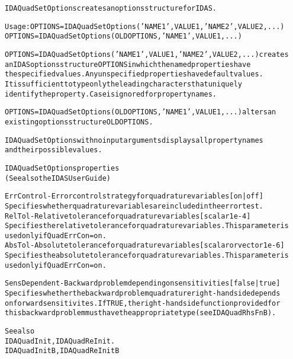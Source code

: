 \begin{alltt}
IDAQuadSetOptions creates an options structure for IDAS.

   Usage: OPTIONS = IDAQuadSetOptions('NAME1',VALUE1,'NAME2',VALUE2,...)
          OPTIONS = IDAQuadSetOptions(OLDOPTIONS,'NAME1',VALUE1,...)

   OPTIONS = IDAQuadSetOptions('NAME1',VALUE1,'NAME2',VALUE2,...) creates 
   an IDAS options structure OPTIONS in which the named properties have 
   the specified values. Any unspecified properties have default values. 
   It is sufficient to type only the leading characters that uniquely 
   identify the property. Case is ignored for property names. 
   
   OPTIONS = IDAQuadSetOptions(OLDOPTIONS,'NAME1',VALUE1,...) alters an 
   existing options structure OLDOPTIONS.
   
   IDAQuadSetOptions with no input arguments displays all property names 
   and their possible values.
   
IDAQuadSetOptions properties
(See also the IDAS User Guide)

ErrControl - Error control strategy for quadrature variables [ on | {off} ]
   Specifies whether quadrature variables are included in the error test.
RelTol - Relative tolerance for quadrature variables [ scalar {1e-4} ]
   Specifies the relative tolerance for quadrature variables. This parameter is
   used only if QuadErrCon=on.
AbsTol - Absolute tolerance for quadrature variables [ scalar or vector {1e-6} ]
   Specifies the absolute tolerance for quadrature variables. This parameter is
   used only if QuadErrCon=on.

SensDependent - Backward problem depending on sensitivities [ {false} | true ]
   Specifies whether the backward problem quadrature right-hand side depends
   on forward sensitivites. If TRUE, the right-hand side function provided for
   this backward problem must have the appropriate type (see IDAQuadRhsFnB).

   See also
        IDAQuadInit, IDAQuadReInit.
        IDAQuadInitB, IDAQuadReInitB
\end{alltt}






\vspace{0.1in}